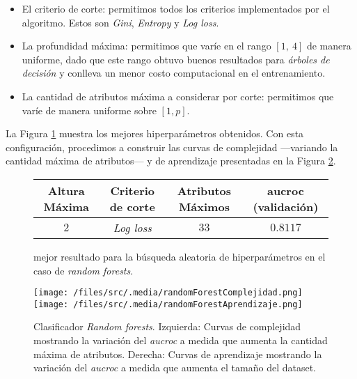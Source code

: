 \begin{itemize}
    \item El criterio de corte: permitimos todos los criterios implementados por el algoritmo. Estos son \textit{Gini}, \textit{Entropy} y \textit{Log loss}. 
    \item La profundidad máxima: permitimos que varíe en el rango $[1,\ 4]$ de manera uniforme, dado que este rango obtuvo buenos resultados para \textit{árboles de decisión} y conlleva un menor costo computacional en el entrenamiento.
    \item La cantidad de atributos máxima a considerar por corte: permitimos que varíe de manera uniforme sobre $[1, p]$.
\end{itemize}

La Figura \ref{random_forest} muestra los mejores hiperparámetros obtenidos. Con esta configuración, procedimos a construir las curvas de complejidad ---variando la cantidad máxima de atributos--- y de aprendizaje presentadas en la Figura \ref{RF}.

\vspace{0.5em}
\begin{figure}[!htbp]
    \begin{center}
        \begin{tabular}{ |c|c|c|c| } 
         \hline
        Altura Máxima   & Criterio de corte & Atributos Máximos  & aucroc (validación) \\
        \hline
        $2$	            & \textit{Log loss} & $33$	            & $0.8117$\\
        \hline	 
        \end{tabular}
    \end{center}
    \caption{mejor resultado para la búsqueda aleatoria de hiperparámetros en el caso de \textit{random forests}.} \label{random_forest}
\end{figure}

\vspace{0.5em}
\begin{figure}[!htbp]
    \centering
    \texttt{[image: /files/src/.media/randomForestComplejidad.png]}
    \texttt{[image: /files/src/.media/randomForestAprendizaje.png]}
    \caption{Clasificador \textit{Random forests}. Izquierda: Curvas de complejidad mostrando la variación del \textit{aucroc} a medida que aumenta la cantidad máxima de atributos. Derecha: Curvas de aprendizaje mostrando la variación del \textit{aucroc} a medida que aumenta el tamaño del dataset.}
    \label{RF}
\end{figure}

